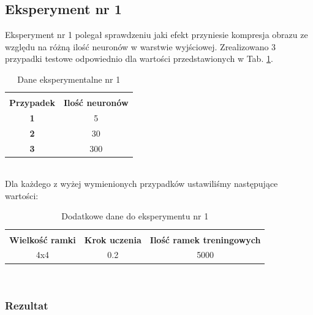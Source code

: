 \documentclass[12pt]{article}
\begin{document}
\newpage
\subsection{Eksperyment nr 1}

Eksperyment nr 1 polegał sprawdzeniu jaki efekt przyniesie kompresja obrazu ze względu na różną ilość neuronów w warstwie wyjściowej. Zrealizowano 3 przypadki testowe odpowiednio dla wartości przedstawionych w Tab.
\ref{dane eksperymentalne doświadczenia 1}. \\
\begin{table}[h!]
 \caption{Dane eksperymentalne nr 1}
 \centering
 \vspace{0.2cm}
 \begin{tabular}{c c}
  \hline\hline\\[-0.4cm]
  \textbf{Przypadek} & \textbf{Ilość neuronów} \\[0.1cm]
  \textbf{1} & 5  \\
  \textbf{2} & 30  \\
  \textbf{3} & 300  \\ [0.1cm]
  \hline
 \end{tabular}
 \label{dane eksperymentalne doświadczenia 1}
\end{table} \\
Dla każdego z wyżej wymienionych przypadków ustawiliśmy następujące wartości: \\
\begin{table}[h!]
 \caption{Dodatkowe dane do eksperymentu nr 1}
 \centering
 \vspace{0.2cm}
 \begin{tabular}{c c c}
  \hline\hline\\[-0.4cm]
  \textbf{Wielkość ramki} & \textbf{Krok uczenia} & \textbf{Ilość ramek treningowych} \\[0.1cm]
  4x4 & 0.2 & 5000  \\ [0.1cm]
  \hline
 \end{tabular}
 \label{dodatkowe dane do eksperymentu nr 1}
\end{table} \\

\subsubsection{Rezultat}
\end{document}

